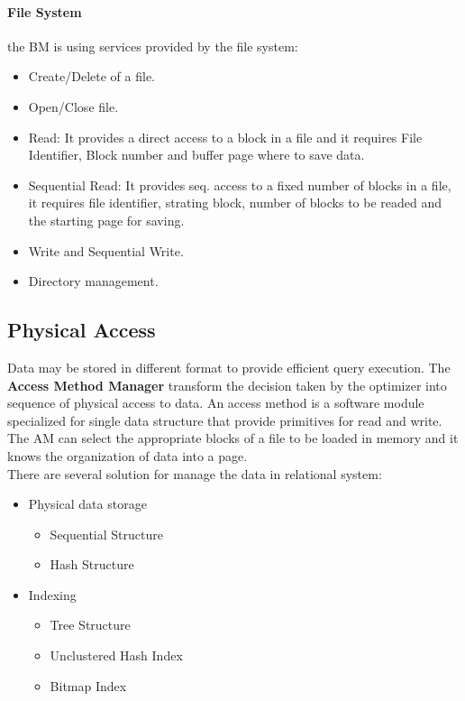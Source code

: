 \documentclass[12pt]{article}
\begin{document}
\paragraph{File System} the BM is using services provided by the file system:
\begin{itemize}
  \item Create/Delete of a file.
  \item Open/Close file.
  \item Read: It provides a direct access to a block in a file and it requires File Identifier, Block number and buffer page where to save data.
  \item Sequential Read: It provides seq. access to a fixed number of blocks in a file, it requires file identifier, strating block, number of blocks to be readed and the starting page for saving.
  \item Write and Sequential Write.
  \item Directory management.
\end{itemize} %

\subsection{Physical Access}
Data may be stored in different format to provide efficient query execution. The \textbf{Access Method Manager} transform the decision taken by the optimizer into sequence of physical access to data. An access method is a software module specialized for single data structure that provide primitives for read and write. The AM can select the appropriate blocks of a file to be loaded in memory and it knows the organization of data into a page.\\
There are several solution for manage the data in relational system:
\begin{itemize}
  \item Physical data storage
  \begin{itemize}
    \item Sequential Structure
    \item Hash Structure
  \end{itemize}
  \item Indexing
  \begin{itemize}
    \item Tree Structure
    \item Unclustered Hash Index
    \item Bitmap Index
  \end{itemize}
\end{itemize}
\end{document}
